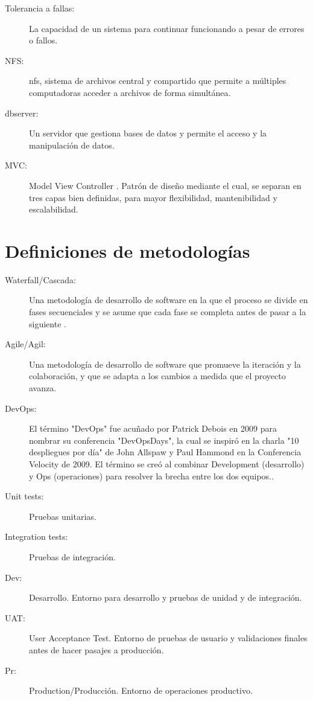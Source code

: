 \begin{description}
    \item [Tolerancia a fallas:] La capacidad de un sistema para continuar funcionando a pesar de errores o fallos.
    \item [NFS:] \Gls{nfs}, sistema de archivos central y compartido que permite a múltiples computadoras acceder a archivos de forma simultánea.
    \item [\Gls{dbserver}:] Un servidor que gestiona bases de datos y permite el acceso y la manipulación de datos.
    \item [MVC:] Model View Controller \cite{pope1988}. Patrón de diseño mediante el cual, se separan en tres capas bien definidas, para mayor flexibilidad, mantenibilidad y escalabilidad.
    
\end{description}

\section{Definiciones de metodologías}
    
\begin{description}

\item[Waterfall/Cascada:] Una metodología de desarrollo de software en la que el proceso se divide en fases secuenciales y se asume que cada fase se completa antes de pasar a la siguiente \cite{royce1970}.
\item[Agile/Agil:] Una metodología de desarrollo de software que promueve la iteración y la colaboración, y que se adapta a los cambios a medida que el proyecto avanza.%
\item[DevOps:] El término "DevOps" fue acuñado por Patrick Debois en 2009 para nombrar su conferencia "DevOpsDays", la cual se inspiró en la charla "10 despliegues por día" de John Allspaw y Paul Hammond en la Conferencia Velocity de 2009. El término se creó al combinar Development (desarrollo) y Ops (operaciones) para resolver la brecha entre los dos equipos.\cite{allspaw2009}.
\item[Unit tests:] Pruebas unitarias.
\item[Integration tests:] Pruebas de integración.
\item[Dev:] Desarrollo. Entorno para desarrollo y pruebas de unidad y de integración.
\item[UAT:] User Acceptance Test. Entorno de pruebas de usuario y validaciones finales antes de hacer pasajes a producción.
\item[Pr:] Production/Producción. Entorno de operaciones productivo.

\end{description}


